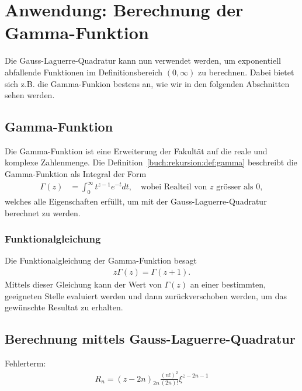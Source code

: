 %
%
%
\section{Anwendung: Berechnung der Gamma-Funktion
  \label{laguerre:section:quad-gamma}}
Die Gauss-Laguerre-Quadratur kann nun verwendet werden,
um exponentiell abfallende Funktionen im Definitionsbereich $(0, \infty)$ zu
berechnen.
Dabei bietet sich z.B. die Gamma-Funkion bestens an, wie wir in den folgenden
Abschnitten sehen werden.

\subsection{Gamma-Funktion}
Die Gamma-Funktion ist eine Erweiterung der Fakultät auf die reale und komplexe
Zahlenmenge.
Die Definition~\ref{buch:rekursion:def:gamma} beschreibt die Gamma-Funktion als
Integral der Form
\begin{align}
\Gamma(z)
 & =
\int_0^\infty t^{z-1} e^{-t} dt
,
\quad
\text{wobei Realteil von $z$ grösser als $0$}
,
\label{laguerre:gamma}
\end{align}
welches alle Eigenschaften erfüllt, um mit der Gauss-Laguerre-Quadratur
berechnet zu werden.

\subsubsection{Funktionalgleichung}
Die Funktionalgleichung der Gamma-Funktion besagt
\begin{align}
z \Gamma(z) = \Gamma(z+1).
\label{laguerre:gamma_funktional}
\end{align}
Mittels dieser Gleichung kann der Wert von $\Gamma(z)$ an einer bestimmten,
geeigneten Stelle evaluiert werden und dann zurückverschoben werden,
um das gewünschte Resultat zu erhalten.

\subsection{Berechnung mittels Gauss-Laguerre-Quadratur}

Fehlerterm:
\begin{align*}
R_n
=
(z - 2n)_{2n} \frac{(n!)^2}{(2n)!} \xi^{z-2n-1}
\end{align*}

